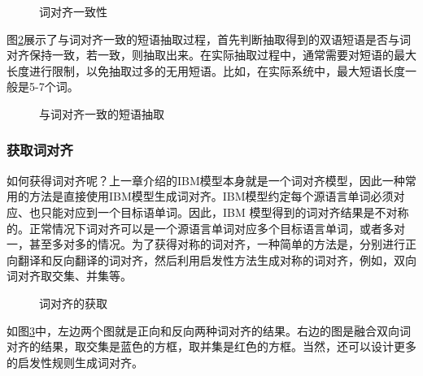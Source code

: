 \begin{figure}[htp]
\centering

\caption{词对齐一致性}
\label{fig:4-14}
\end{figure}

\parinterval 图\ref{fig:4-15}展示了与词对齐一致的短语抽取过程，首先判断抽取得到的双语短语是否与词对齐保持一致，若一致，则抽取出来。在实际抽取过程中，通常需要对短语的最大长度进行限制，以免抽取过多的无用短语。比如，在实际系统中，最大短语长度一般是5-7个词。

\begin{figure}[htp]
\centering

\caption{与词对齐一致的短语抽取}
\label{fig:4-15}
\end{figure}


\subsubsection{获取词对齐}

\parinterval 如何获得词对齐呢？上一章介绍的IBM模型本身就是一个词对齐模型，因此一种常用的方法是直接使用IBM模型生成词对齐。IBM模型约定每个源语言单词必须对应、也只能对应到一个目标语单词。因此，IBM 模型得到的词对齐结果是不对称的。正常情况下词对齐可以是一个源语言单词对应多个目标语言单词，或者多对一，甚至多对多的情况。为了获得对称的词对齐，一种简单的方法是，分别进行正向翻译和反向翻译的词对齐，然后利用启发性方法生成对称的词对齐，例如，双向词对齐取交集、并集等。

\begin{figure}[htp]
\centering

\caption{词对齐的获取}
\label{fig:4-16}
\end{figure}

\parinterval 如图\ref{fig:4-16}中，左边两个图就是正向和反向两种词对齐的结果。右边的图是融合双向词对齐的结果，取交集是蓝色的方框，取并集是红色的方框。当然，还可以设计更多的启发性规则生成词对齐\cite{koehn2000estimating,koehn2007factored}。

